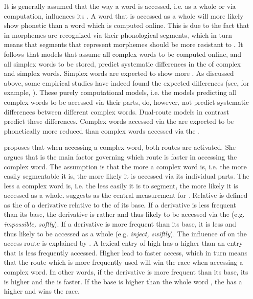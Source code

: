 {It is generally assumed that the way a word is accessed, i.e. as a whole or via computation, influences its . A word that is accessed as a whole will more likely show phonetic  than a word which is computed online.  This is due to the fact that in  morphemes are recognized via their phonological segments, which in turn means that segments that represent morphemes should be more resistant to . It follows that models that assume all complex words to be computed online, and all simplex words to be stored, predict systematic differences in the  of complex and simplex words. Simplex words are expected to show more . As discussed above, some empirical studies have indeed found the expected differences (see, for example, \citealt{Cho.2001,Sugahara.2009,Smith.2012}).
These purely computational models, i.e. the models predicting all complex words to be accessed via their parts,  do, however, not predict systematic differences between different complex words. Dual-route models in contrast predict these differences. Complex words accessed via the   are expected to be phonetically more reduced than complex words accessed via the .



\cite{Hay.2001,Hay.2003} proposes that when accessing a complex word, both routes are activated. She argues that  is the main factor governing  which route is faster in accessing the complex word. The assumption is that the more  a complex word is, i.e. the more easily segmentable it is, the more likely it is accessed via its individual parts. The less  a complex word is, i.e.  the less easily it is to segment, the more likely it is accessed as a whole. \cite{Hay.2001,Hay.2003} suggests  as the central measurement for . Relative  is defined as the  of a derivative relative to the  of its base. If a derivative is less frequent than its base, the derivative is rather  and thus likely to be accessed via the  (e.g. \textit{impossible, softly}).  If a derivative is more frequent than its base, it is less  and thus likely to be accessed as a whole (e.g. \textit{inject, swiftly}). 
The influence of  on the access route is explained by . A lexical entry of high  has a higher  than an entry that is less frequently accessed. Higher  lead to faster access, which in turn means that the route which is more frequently used will win the race when accessing a complex word. In other words, if the derivative is more frequent than its base, its  is higher and the  is faster. If the base  is higher than the whole word , the  has a higher  and wins the race.


}
